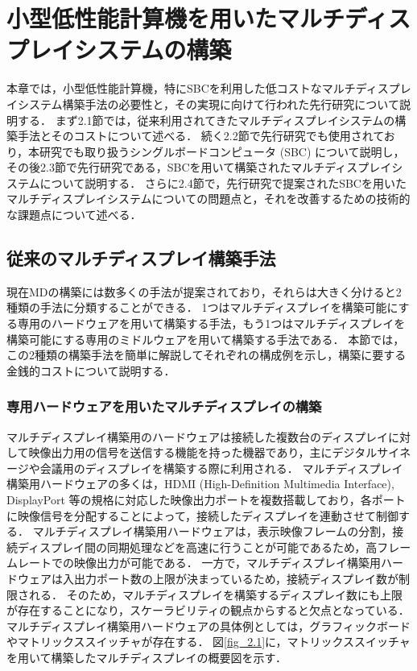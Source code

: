 \chapter{小型低性能計算機を用いたマルチディスプレイシステムの構築}

本章では，小型低性能計算機，特にSBCを利用した低コストなマルチディスプレイシステム構築手法の必要性と，その実現に向けて行われた先行研究について説明する．
まず2.1節では，従来利用されてきたマルチディスプレイシステムの構築手法とそのコストについて述べる．
続く2.2節で先行研究でも使用されており，本研究でも取り扱うシングルボードコンピュータ (SBC) について説明し，その後2.3節で先行研究である，SBCを用いて構築されたマルチディスプレイシステムについて説明する．
さらに2.4節で，先行研究で提案されたSBCを用いたマルチディスプレイシステムについての問題点と，それを改善するための技術的な課題点について述べる．

\section{従来のマルチディスプレイ構築手法}
現在MDの構築には数多くの手法が提案されており，それらは大きく分けると2種類の手法に分類することができる\cite{pccluster,6693038}．
1つはマルチディスプレイを構築可能にする専用のハードウェアを用いて構築する手法，もう1つはマルチディスプレイを構築可能にする専用のミドルウェアを用いて構築する手法である．
本節では，この2種類の構築手法を簡単に解説してそれぞれの構成例を示し，構築に要する金銭的コストについて説明する．

\subsection*{専用ハードウェアを用いたマルチディスプレイの構築}

マルチディスプレイ構築用のハードウェアは接続した複数台のディスプレイに対して映像出力用の信号を送信する機能を持った機器であり，主にデジタルサイネージ\cite{signage}や会議用のディスプレイを構築する際に利用される．
マルチディスプレイ構築用ハードウェアの多くは，HDMI (High-Definition Multimedia Interface), DisplayPort \cite{displayport}等の規格に対応した映像出力ポートを複数搭載しており，各ポートに映像信号を分配することによって，接続したディスプレイを連動させて制御する．
マルチディスプレイ構築用ハードウェアは，表示映像フレームの分割，接続ディスプレイ間の同期処理などを高速に行うことが可能であるため，高フレームレートでの映像出力が可能である．
一方で，マルチディスプレイ構築用ハードウェアは入出力ポート数の上限が決まっているため，接続ディスプレイ数が制限される．
そのため，マルチディスプレイを構築するディスプレイ数にも上限が存在することになり，スケーラビリティの観点からすると欠点となっている．
マルチディスプレイ構築用ハードウェアの具体例としては，グラフィックボードやマトリックススイッチャが存在する．
図\ref{fig_2.1}に，マトリックススイッチャを用いて構築したマルチディスプレイの概要図を示す．

